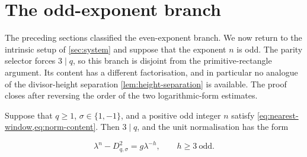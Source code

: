 %
%
\section{The odd-exponent branch}
\label{sec:odd-exponents}

The preceding sections classified the even-exponent branch. We now return to
the intrinsic setup of \cref{sec:system} and suppose that the exponent $n$ is
odd. The parity selector forces $3\mid q$, so this branch is disjoint from
the primitive-rectangle argument. Its content has a different factorisation,
and in particular no analogue of the divisor-height separation
\cref{lem:height-separation} is available. The proof closes after reversing
the order of the two logarithmic-form estimates.

\begin{proposition}
\label{prop:odd-negative-exponent}
Suppose that $q\geqslant1$, $\sigma\in\{1,-1\}$, and a positive odd integer
$n$ satisfy \cref{eq:nearest-window,eq:norm-content}. Then $3\mid q$, and
the unit normalisation has the form

\begin{equation}
 \lambda^n-D_{q,\sigma}^2=g\lambda^{-h},
 \qquad
 h\geqslant3\ \text{odd}.
 \label{eq:odd-negative-target}
\end{equation}
\end{proposition}

